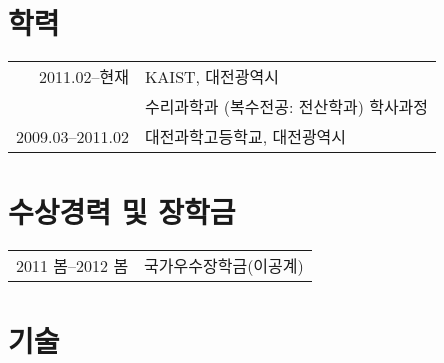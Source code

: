 \documentclass[a4paper,10pt]{article}
\begin{document}
\section{학력}
\begin{tabular}{rl}
  2011.02--현재 & KAIST, 대전광역시 \\
  & \textsc{수리과학과} (복수전공: \textsc{전산학과}) 학사과정 \\
  2009.03--2011.02 & 대전과학고등학교, 대전광역시
\end{tabular}

\section{수상경력 및 장학금}
\begin{tabular}{rl}
  2011 봄--2012 봄 & 국가우수장학금(이공계)
\end{tabular}

\section{기술}


\end{document}
